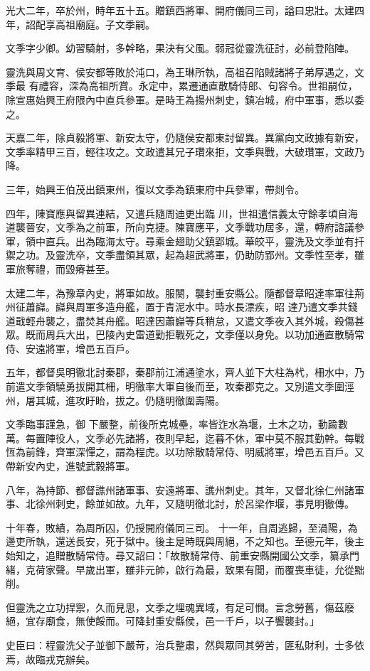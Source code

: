 \begin{pinyinscope}
 光大二年，卒於州，時年五十五。贈鎮西將軍、開府儀同三司，謚曰忠壯。太建四年，詔配享高祖廟庭。子文季嗣。



 文季字少卿。幼習騎射，多幹略，果決有父風。弱冠從靈洗征討，必前登陷陣。



 靈洗與周文育、侯安都等敗於沌口，為王琳所執，高祖召陷賊諸將子弟厚遇之，文季最
 有禮容，深為高祖所賞。永定中，累遷通直散騎侍郎、句容令。世祖嗣位，除宣惠始興王府限內中直兵參軍。是時王為揚州刺史，鎮冶城，府中軍事，悉以委之。



 天嘉二年，除貞毅將軍、新安太守，仍隨侯安都東討留異。異黨向文政據有新安，文季率精甲三百，輕往攻之。文政遣其兄子瓚來拒，文季與戰，大破瓚軍，文政乃降。



 三年，始興王伯茂出鎮東州，復以文季為鎮東府中兵參軍，帶剡令。



 四年，陳寶應與留異連結，又遣兵隨周迪更出臨
 川，世祖遣信義太守餘孝頃自海道襲晉安，文季為之前軍，所向克捷。陳寶應平，文季戰功居多，還，轉府諮議參軍，領中直兵。出為臨海太守。尋乘金翅助父鎮郢城。華皎平，靈洗及文季並有扞禦之功。及靈洗卒，文季盡領其眾，起為超武將軍，仍助防郢州。文季性至孝，雖軍旅奪禮，而毀瘠甚至。



 太建二年，為豫章內史，將軍如故。服闋，襲封重安縣公。隨都督章昭達率軍往荊州征蕭巋。巋與周軍多造舟艦，置于青泥水中。時水長漂疾，昭
 達乃遣文季共錢道戢輕舟襲之，盡焚其舟艦。昭達因蕭巋等兵稍怠，又遣文季夜入其外城，殺傷甚眾。既而周兵大出，巴陵內史雷道勤拒戰死之，文季僅以身免。以功加通直散騎常侍、安遠將軍，增邑五百戶。



 五年，都督吳明徹北討秦郡，秦郡前江浦通塗水，齊人並下大柱為杙，柵水中，乃前遣文季領驍勇拔開其柵，明徹率大軍自後而至，攻秦郡克之。又別遣文季圍涇州，屠其城，進攻盱眙，拔之。仍隨明徹圍壽陽。



 文季臨事謹急，御
 下嚴整，前後所克城壘，率皆迮水為堰，土木之功，動踰數萬。每置陣役人，文季必先諸將，夜則早起，迄暮不休，軍中莫不服其勤幹。每戰恆為前鋒，齊軍深憚之，謂為程虎。以功除散騎常侍、明威將軍，增邑五百戶。又帶新安內史，進號武毅將軍。



 八年，為持節、都督譙州諸軍事、安遠將軍、譙州刺史。其年，又督北徐仁州諸軍事、北徐州刺史，餘並如故。九年，又隨明徹北討，於呂梁作堰，事見明徹傳。



 十年春，敗績，為周所囚，仍授開府儀同三司。
 十一年，自周逃歸，至渦陽，為邊吏所執，還送長安，死于獄中。後主是時既與周絕，不之知也。至德元年，後主始知之，追贈散騎常侍。尋又詔曰：「故散騎常侍、前重安縣開國公文季，纂承門緒，克荷家聲。早歲出軍，雖非元帥，啟行為最，致果有聞，而覆喪車徒，允從黜削。



 但靈洗之立功捍禦，久而見思，文季之埋魂異域，有足可憫。言念勞舊，傷茲廢絕，宜存廟食，無使餒而。可降封重安縣侯，邑一千戶，以子饗襲封。」



 史臣曰：程靈洗父子並御下嚴苛，治兵整肅，然與眾同其勞苦，匪私財利，士多依焉，故臨戎克辦矣。



\end{pinyinscope}